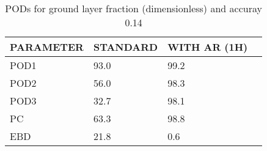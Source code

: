 \begin{table}[]
\begin{center}
\begin{tabular}{|l|l|l|l|}
\hline
\multicolumn{1}{|c|}{\cellcolor[HTML]{C0C0C0}\textbf{PARAMETER}} & \multicolumn{1}{c|}{\cellcolor[HTML]{C0C0C0}\textbf{STANDARD}} & \multicolumn{1}{c|}{\cellcolor[HTML]{C0C0C0}\textbf{WITH AR (1H)}} \\
\hline
\cellcolor[HTML]{C0C0C0}POD1  & 93.0                                & 99.2         \\
\cellcolor[HTML]{C0C0C0}POD2  & 56.0                                & 98.3         \\
\cellcolor[HTML]{C0C0C0}POD3  & 32.7                                & 98.1         \\
\cellcolor[HTML]{C0C0C0}PC    & 63.3                                  & 98.8           \\
\cellcolor[HTML]{C0C0C0}EBD   & 21.8                                 & 0.6          \\
\hline
\end{tabular}
\caption{PODs for ground layer fraction (dimensionless) and accuray 0.14}
\end{center}
\end{table}
